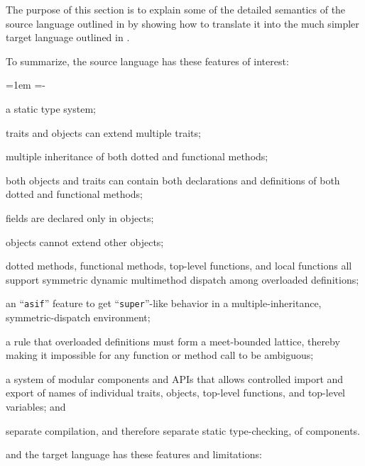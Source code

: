 The purpose of this section is to explain some of the detailed semantics
of the source language outlined in  by showing
how to translate it into the much simpler target language outlined
in .

To summarize, the source language has these features of interest:
\begin{trivlist}\leftskip=1em \itemindent=-\leftskip
\item[] a static type system;
\item[] traits and objects can extend multiple traits;
\item[] multiple inheritance of both dotted and functional methods;
\item[] both objects and traits can contain both declarations and definitions of both dotted and functional methods;
\item[] fields are declared only in objects;
\item[] objects cannot extend other objects;
\item[] dotted methods, functional methods, top-level functions, and local functions all support symmetric dynamic multimethod dispatch among overloaded definitions;
\item[] an ``{\tt asif}'' feature to get ``{\tt super}''-like behavior in a multiple-inheritance, symmetric-dispatch environment;
\item[] a rule that overloaded definitions must form a meet-bounded lattice, thereby making it impossible for any function or method call to be ambiguous;
\item[] a system of modular components and APIs that allows controlled import and export of names of individual traits, objects, top-level functions, and top-level variables; and
\item[] separate compilation, and therefore separate static type-checking, of components.
\end{trivlist}
and the target language has these features and limitations:
